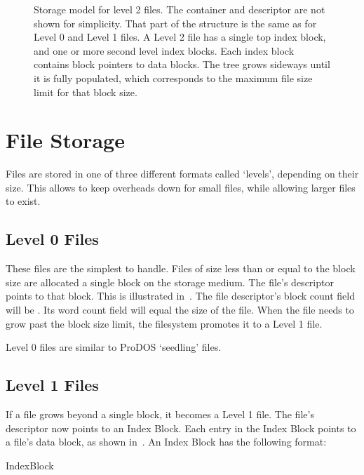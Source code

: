 \begin{figure}
 \centering

 \caption[Level 2 file structure]{\label{fig:file-level2} Storage
   model for level 2 files. The container and descriptor are not shown
   for simplicity. That part of the structure is the same as for Level
   0 and Level 1 files. A Level 2 file has a single top index block,
   and one or more second level index blocks. Each index block
   contains \glspl{block pointer} to data blocks. The tree grows
   sideways until it is fully populated, which corresponds to the
   maximum file size limit for that block size.}
\end{figure}


\section{File Storage}

Files are stored in one of three different formats called ‘levels’, depending
on their size. This allows to keep overheads down for small files, while
allowing larger files to exist.

\subsection{Level 0 Files}

These files are the simplest to handle. Files of size less than or
equal to the block size are allocated a single block on the storage
medium. The file's \gls{descriptor} points to that block. This is
illustrated in~. The file descriptor's block
count field will be . Its word count field will equal the size
of the file. When the file needs to grow past the block size limit,
the filesystem promotes it to a Level 1 file.

Level 0 files are similar to ProDOS ‘seedling’ files.

\subsection{Level 1 Files}

If a file grows beyond a single block, it becomes a Level 1 file. The
file's \gls{descriptor} now points to an Index Block. Each entry in
the Index Block points to a file's data block, as shown
in~. An Index Block has the following format:

\begin{datastructure}[Offset]{IndexBlock}

\end{datastructure}

